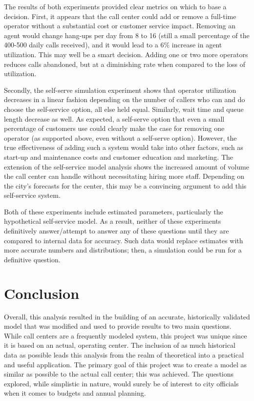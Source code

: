 \documentclass[12pt,twocolumn]{article}
\begin{document}
The results of both experiments provided clear metrics on which to base a decision.  First, it appears that the call center could add or remove a full-time operator without a substantial cost or customer service impact.  Removing an agent would change hang-ups per day from 8 to 16 (still a small percentage of the 400-500 daily calls received), and it would lead to a 6\% increase in agent utilization.  This may well be a smart decision.  Adding one or two more operators reduces calls abandoned, but at a diminishing rate when compared to the loss of utilization.

\par

Secondly, the self-serve simulation experiment shows that operator utilization decreases in a linear fashion depending on the number of callers who can and do choose the self-service option, all else held equal.  Similarly, wait time and queue length decrease as well.  As expected, a self-serve option that even a small percentage of customers use could clearly make the case for removing one operator (as supported above, even without a self-serve option).  However, the true effectiveness of adding such a system would take into other factors, such as start-up and maintenance costs and customer education and marketing.  The extension of the self-service model analysis shows the increased amount of volume the call center can handle without necessitating hiring more staff.  Depending on the city's forecasts for the center, this may be a convincing argument to add this self-service system.

\par

Both of these experiments include estimated parameters, particularly the hypothetical self-service model.  As a result, neither of these experiments definitively answer/attempt to answer any of these questions until they are compared to internal data for accuracy.  Such data would replace estimates with more accurate numbers and distributions; then, a simulation could be run for a definitive question.


\section{Conclusion}

Overall, this analysis resulted in the building of an accurate, historically validated model that was modified and used to provide results to two main questions.  While call centers are a frequently modeled system, this project was unique since it is based on an actual, operating center.  The inclusion of as much historical data as possible leads this analysis from the realm of theoretical into a practical and useful application.  The primary goal of this project was to create a model as similar as possible to the actual call center; this was achieved.  The questions explored, while simplistic in nature, would surely be of interest to city officials when it comes to budgets and annual planning.
\end{document}
